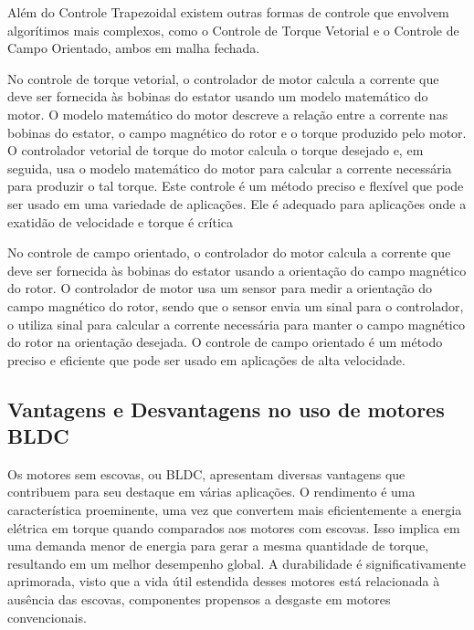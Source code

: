\documentclass[12pt, a4paper]{article}
\begin{document}
Além do Controle Trapezoidal existem outras formas de controle que envolvem algorítimos mais complexos, como o Controle de Torque Vetorial e o Controle de Campo Orientado, ambos em malha fechada.

No controle de torque vetorial, o controlador de motor calcula a corrente que deve ser fornecida às bobinas do estator usando um modelo matemático do motor. O modelo matemático do motor descreve a relação entre a corrente nas bobinas do estator, o campo magnético do rotor e o torque produzido pelo motor. O controlador vetorial de torque do motor calcula o torque desejado e, em seguida, usa o modelo matemático do motor para calcular a corrente necessária para produzir o tal torque. Este controle é um método preciso e flexível que pode ser usado em uma variedade de aplicações. Ele é adequado para aplicações onde a exatidão de velocidade e torque é crítica

No controle de campo orientado, o controlador do motor calcula a corrente que deve ser fornecida às bobinas do estator usando a orientação do campo magnético do rotor. O controlador de motor usa um sensor para medir a orientação do campo magnético do rotor, sendo que o sensor envia um sinal para o controlador, o utiliza sinal para calcular a corrente necessária para manter o campo magnético do rotor na orientação desejada. O controle de campo orientado é um método preciso e eficiente que pode ser usado em aplicações de alta velocidade.

\pagebreak

\subsection{Vantagens e Desvantagens no uso de motores BLDC}
Os motores sem escovas, ou BLDC, apresentam diversas vantagens que contribuem para seu destaque em várias aplicações. O rendimento é uma característica proeminente, uma vez que convertem mais eficientemente a energia elétrica em torque quando comparados aos motores com escovas. Isso implica em uma demanda menor de energia para gerar a mesma quantidade de torque, resultando em um melhor desempenho global. A durabilidade é significativamente aprimorada, visto que a vida útil estendida desses motores está relacionada à ausência das escovas, componentes propensos a desgaste em motores convencionais.
\end{document}
